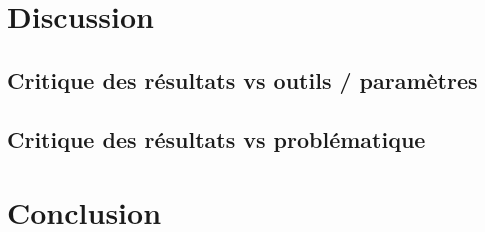 \documentclass[12pt]{article}
\begin{document}
\section{Discussion}
\subsection{Critique des résultats vs outils / paramètres}
\subsection{Critique des résultats vs problématique}
\blindtext[3]
\section{Conclusion}
\blindtext[1]

\setcounter{biburlnumpenalty}{7000}
\setcounter{biburllcpenalty}{7000}
\setcounter{biburlucpenalty}{7000}

\printbibliography[heading=bibintoc,title=References]
\end{document}
